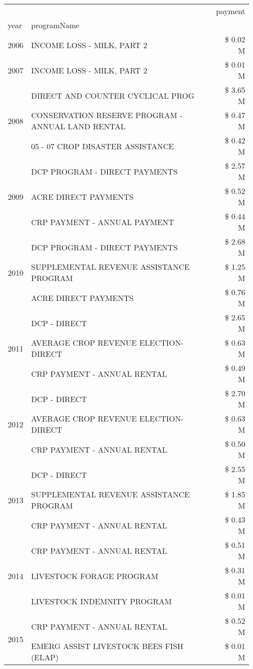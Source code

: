 \begin{tabular}{llr}
\toprule
 &  & payment \\
year & programName &  \\
\midrule
2006 & INCOME LOSS - MILK, PART 2 & \$ 0.02 M \\
\cline{1-3}
2007 & INCOME LOSS - MILK, PART 2 & \$ 0.01 M \\
\cline{1-3}
\multirow[t]{3}{*}{2008} & DIRECT AND COUNTER CYCLICAL PROG & \$ 3.65 M \\
 & CONSERVATION RESERVE PROGRAM - ANNUAL LAND RENTAL & \$ 0.47 M \\
 & 05 - 07 CROP DISASTER ASSISTANCE & \$ 0.42 M \\
\cline{1-3}
\multirow[t]{3}{*}{2009} & DCP PROGRAM - DIRECT PAYMENTS & \$ 2.57 M \\
 & ACRE DIRECT PAYMENTS & \$ 0.52 M \\
 & CRP PAYMENT - ANNUAL PAYMENT & \$ 0.44 M \\
\cline{1-3}
\multirow[t]{3}{*}{2010} & DCP PROGRAM - DIRECT PAYMENTS & \$ 2.68 M \\
 & SUPPLEMENTAL REVENUE ASSISTANCE PROGRAM & \$ 1.25 M \\
 & ACRE DIRECT PAYMENTS & \$ 0.76 M \\
\cline{1-3}
\multirow[t]{3}{*}{2011} & DCP - DIRECT & \$ 2.65 M \\
 & AVERAGE CROP REVENUE ELECTION-DIRECT & \$ 0.63 M \\
 & CRP PAYMENT - ANNUAL RENTAL & \$ 0.49 M \\
\cline{1-3}
\multirow[t]{3}{*}{2012} & DCP - DIRECT & \$ 2.70 M \\
 & AVERAGE CROP REVENUE ELECTION-DIRECT & \$ 0.63 M \\
 & CRP PAYMENT - ANNUAL RENTAL & \$ 0.50 M \\
\cline{1-3}
\multirow[t]{3}{*}{2013} & DCP - DIRECT & \$ 2.55 M \\
 & SUPPLEMENTAL REVENUE ASSISTANCE PROGRAM & \$ 1.85 M \\
 & CRP PAYMENT - ANNUAL RENTAL & \$ 0.43 M \\
\cline{1-3}
\multirow[t]{3}{*}{2014} & CRP PAYMENT - ANNUAL RENTAL & \$ 0.51 M \\
 & LIVESTOCK FORAGE PROGRAM & \$ 0.31 M \\
 & LIVESTOCK INDEMNITY PROGRAM & \$ 0.01 M \\
\cline{1-3}
\multirow[t]{3}{*}{2015} & CRP PAYMENT - ANNUAL RENTAL & \$ 0.52 M \\
 & EMERG ASSIST LIVESTOCK BEES FISH (ELAP) & \$ 0.01 M \\

\end{tabular}
